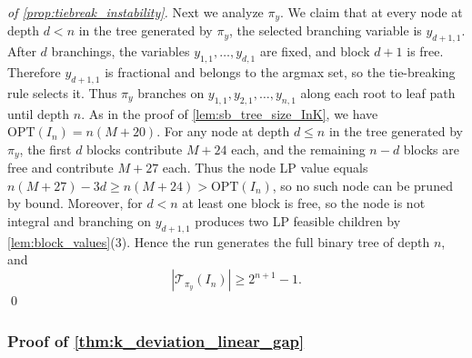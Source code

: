 \documentclass[smallextended,envcountsect]{svjour3} %
\newcommand{\Tcal}{\mathcal{T}}
\newcommand{\0}{\mathbf{0}}
\newcommand{\1}{\mathbf{1}} %
\begin{document}
\begin{proof}[of \cref{prop:tiebreak_instability}]
	Next we analyze $\pi_y$.
	We claim that at every node at depth $d<n$ in the tree generated by $\pi_y$, the selected branching variable is $y_{d+1,1}$.
	After $d$ branchings, the variables $y_{1,1},\dots,y_{d,1}$ are fixed, and block $d+1$ is free.
	Therefore $y_{d+1,1}$ is fractional and belongs to the argmax set, so the tie-breaking rule selects it.
	Thus $\pi_y$ branches on $y_{1,1},y_{2,1},\dots,y_{n,1}$ along each root to leaf path until depth $n$.
	As in the proof of \cref{lem:sb_tree_size_InK}, we have $\mathrm{OPT}(I_n)=n(M+20)$.
	For any node at depth $d\le n$ in the tree generated by $\pi_y$, the first $d$ blocks contribute $M+24$ each, and the remaining $n-d$ blocks are free and contribute $M+27$ each.
	Thus the node LP value equals $n(M+27)-3d\ge n(M+24)>\mathrm{OPT}(I_n)$, so no such node can be pruned by bound.
	Moreover, for $d<n$ at least one block is free, so the node is not integral and branching on $y_{d+1,1}$ produces two LP feasible children by \cref{lem:block_values}(3).
	Hence the run generates the full binary tree of depth $n$, and
	\[
		|\Tcal_{\pi_y}(I_n)|\ge 2^{n+1}-1.
	\]
\leavevmode\qed
\end{proof}

\subsubsection{Proof of \cref{thm:k_deviation_linear_gap}}
\end{document}
